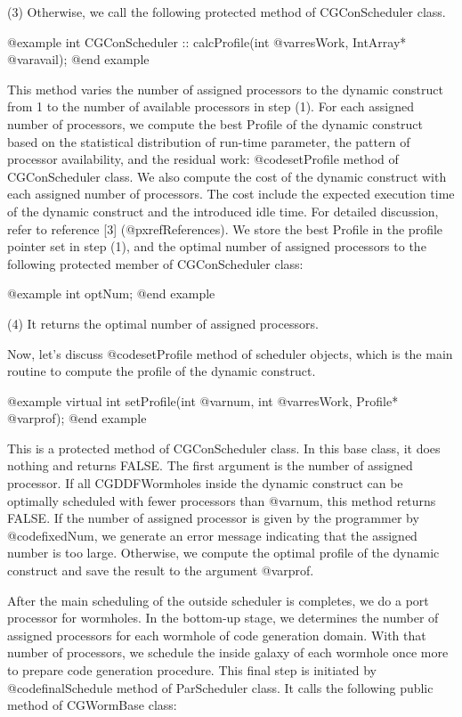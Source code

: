 {(3) Otherwise, we call the following protected method of CGConScheduler class.

@example
int CGConScheduler :: calcProfile(int @var{resWork}, IntArray* @var{avail});
@end example

This method varies the number of assigned processors to the dynamic
construct from 1 to the number of available processors in step (1).
For each assigned number of processors, we compute the best Profile
of the dynamic construct based on the statistical distribution of run-time
parameter, the pattern of processor availability, and the residual work:
@code{setProfile} method of CGConScheduler class.
We also compute the cost of the dynamic construct with each assigned
number of processors. The cost include the expected execution time of the
dynamic construct and the introduced idle time. For detailed discussion,
refer to reference [3] (@pxref{References}). We store the best Profile
in the profile pointer set in step (1), and the optimal number of
assigned processors to the following protected member of CGConScheduler class:

@example
int optNum;
@end example

(4) It returns the optimal number of assigned processors.

Now, let's discuss @code{setProfile} method of scheduler objects, which is
the main routine to compute the profile of the dynamic construct.

@example
virtual int setProfile(int @var{num}, int @var{resWork}, Profile* @var{prof});
@end example

This is a protected method of CGConScheduler class. In this base class, it
does nothing and returns FALSE. The first argument is the number of assigned 
processor. If all CGDDFWormholes inside the dynamic construct can be
optimally scheduled with fewer processors than @var{num}, this method
returns FALSE. If the number of assigned processor is given by the
programmer by @code{fixedNum}, we generate an error message indicating that
the assigned number is too large. 
Otherwise, we compute the optimal profile of the dynamic construct and
save the result to the argument @var{prof}.

After the main scheduling of the outside scheduler is completes, we do a
port processor for wormholes. In the bottom-up stage, we determines the
number of assigned processors for each wormhole of code generation domain.
With that number of processors, we schedule the inside galaxy of each wormhole
once more to prepare code generation procedure. This final step is
initiated by @code{finalSchedule} method of ParScheduler class. It
calls the following public method of CGWormBase class:

}
